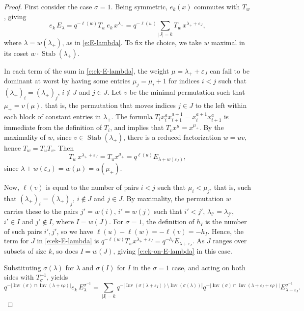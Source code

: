\documentclass[12pt]{amsart}
\theoremstyle{definition}
\theoremstyle{remark}
\DeclareMathOperator{\Inv}{Inv}
\DeclareMathOperator{\Stab}{Stab}
\begin{document}
\begin{proof}
First consider the case $\sigma =1$.  Being symmetric, $e_{k}(x)$
commutes with $T_{w}$, giving
\begin{equation}\label{e:ek-E-lambda}
e_{k}\, E_{\lambda } = q^{-\ell(w)} T_{w}\, e_{k}\, x^{\lambda _{+}} =
q^{-\ell(w)}\sum _{|J| = k} T_{w}\, x^{\lambda
_{+}+\varepsilon _{J}},
\end{equation}
where $\lambda = w(\lambda _{+})$, as in \eqref{e:E-lambda}.  To fix
the choice, we take $w$ maximal in its coset $w\cdot \Stab (\lambda
_{+})$.

In each term of the sum in \eqref{e:ek-E-lambda}, the weight $\mu
=\lambda _{+}+\varepsilon _{J}$ can fail to be dominant at worst by
having some entries $\mu _{j} = \mu _{i}+1$ for indices $i<j$ such
that $(\lambda _{+})_{i} = (\lambda _{+})_{j}$, $i\not \in J$ and
$j\in J$.  Let $v$ be the minimal permutation such that $\mu _{+} =
v(\mu )$, that is, the permutation that moves indices $j\in J$ to the
left within each block of constant entries in $\lambda _{+}$.  The
formula $T_{i} x_{i}^{a}x_{i+1}^{a+1} = x_{i}^{a+1}x_{i+1}^{a}$ is
immediate from the definition of $T_{i}$, and implies that $T_{v}
x^{\mu } = x^{\mu _{+}}$.  By the maximality of $w$, since $v\in \Stab
(\lambda _{+})$, there is a reduced factorization $w = uv$, hence
$T_{w} = T_{u}T_{v}$.  Then
\begin{equation}\label{e:Tw-term}
T_{w}\, x^{\lambda _{+}+\varepsilon _{J}} = T_{u} x^{\mu _{+}} =
q^{\ell(u)} E_{\lambda +w(\varepsilon _{J})},
\end{equation}
since $\lambda +w(\varepsilon _{J}) = w(\mu ) = u(\mu _{+})$.

Now, $\ell(v)$ is equal to the number of pairs $i<j$ such that $\mu
_{i}<\mu _{j}$, that is, such that $(\lambda _{+})_{i}= (\lambda
_{+})_{j}$, $i\not \in J$ and $j\in J$.  By maximality, the
permutation $w$ carries these to the pairs $j' = w(i)$, $i' = w(j)$
such that $i' < j'$, $\lambda _{i'} = \lambda _{j'}$, $i'\in I$ and
$j'\not \in I$, where $I = w(J)$.  For $\sigma =1$, the definition of
$h_{I}$ is the number of such pairs $i',j'$, so we have $\ell(u)-\ell(w) =
-\ell(v) = -h_{I}$.  Hence, the term for $J$ in \eqref{e:ek-E-lambda} is
$q^{-\ell(w)} T_{w} x^{\lambda _{+}+\varepsilon _{J}} = q^{-h_{I}}
E_{\lambda +\varepsilon _{I}}$.  As $J$ ranges over subsets of size
$k$, so does $I = w(J)$, giving \eqref{e:ek-on-E-lambda} in this case.

Substituting $\sigma (\lambda )$ for $\lambda $ and $\sigma (I)$ for
$I$ in the $\sigma =1$ case, and acting on both sides with $T_{\sigma
}^{-1}$, yields
\begin{equation}\label{e:ek-on-E-lambda-twist}
q^{-|\Inv (\sigma )\cap \Inv (\lambda +\epsilon \rho )|} e_{k}\,
E^{\sigma ^{-1}}_{\lambda } = \sum _{|I|=k} q^{-|\Inv (\sigma (\lambda
+\varepsilon _{I}))\setminus \Inv (\sigma (\lambda ))|} q^{-|\Inv
(\sigma )\cap \Inv (\lambda +\varepsilon _{I} + \epsilon \rho )|}
E^{\sigma ^{-1}}_{\lambda +\varepsilon _{I}}.
\end{equation}


\end{proof}
\end{document}
